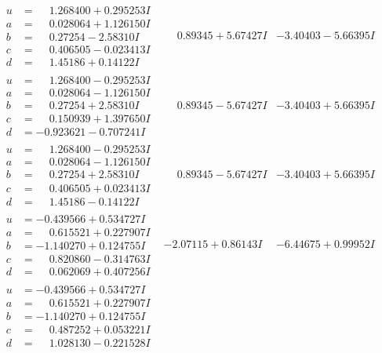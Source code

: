 \documentclass[1p]{elsarticle_modified}
\theoremstyle{definition}
\begin{document}
$$\begin{array}{c|c|c}
\begin{aligned}
u &= \phantom{-}1.268400 + 0.295253 I \\
a &= \phantom{-}0.028064 + 1.126150 I \\
b &= \phantom{-}0.27254 - 2.58310 I \\
c &= \phantom{-}0.406505 - 0.023413 I \\
d &= \phantom{-}1.45186 + 0.14122 I\end{aligned}
 & \phantom{-}0.89345 + 5.67427 I & -3.40403 - 5.66395 I \\ \hline\begin{aligned}
u &= \phantom{-}1.268400 - 0.295253 I \\
a &= \phantom{-}0.028064 - 1.126150 I \\
b &= \phantom{-}0.27254 + 2.58310 I \\
c &= \phantom{-}0.150939 + 1.397650 I \\
d &= -0.923621 - 0.707241 I\end{aligned}
 & \phantom{-}0.89345 - 5.67427 I & -3.40403 + 5.66395 I \\ \hline\begin{aligned}
u &= \phantom{-}1.268400 - 0.295253 I \\
a &= \phantom{-}0.028064 - 1.126150 I \\
b &= \phantom{-}0.27254 + 2.58310 I \\
c &= \phantom{-}0.406505 + 0.023413 I \\
d &= \phantom{-}1.45186 - 0.14122 I\end{aligned}
 & \phantom{-}0.89345 - 5.67427 I & -3.40403 + 5.66395 I \\ \hline\begin{aligned}
u &= -0.439566 + 0.534727 I \\
a &= \phantom{-}0.615521 + 0.227907 I \\
b &= -1.140270 + 0.124755 I \\
c &= \phantom{-}0.820860 - 0.314763 I \\
d &= \phantom{-}0.062069 + 0.407256 I\end{aligned}
 & -2.07115 + 0.86143 I & -6.44675 + 0.99952 I \\ \hline\begin{aligned}
u &= -0.439566 + 0.534727 I \\
a &= \phantom{-}0.615521 + 0.227907 I \\
b &= -1.140270 + 0.124755 I \\
c &= \phantom{-}0.487252 + 0.053221 I \\
d &= \phantom{-}1.028130 - 0.221528 I\end{aligned}

\end{array}$$
\end{document}
